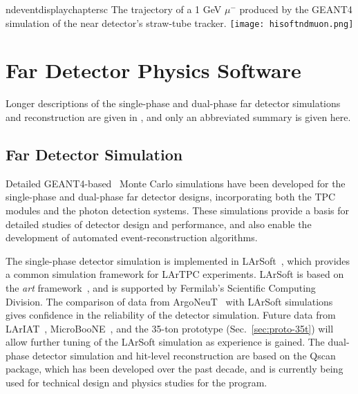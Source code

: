 \begin{cdrfigure}{ndeventdisplaychaptersc}
{The trajectory of a 1 GeV $\mu^-$ produced by the GEANT4 simulation of the near detector's straw-tube tracker.}
\texttt{[image: hisoftndmuon.png]}
\end{cdrfigure}

\section{Far Detector Physics Software}
\label{sec:detectors-sc-physics-software}

Longer descriptions of the single-phase and dual-phase far detector simulations and reconstruction are given
in \anxreco, and only an abbreviated summary is given here.

%

\subsection{Far Detector Simulation}
\label{sec:detectors-sc-physics-software-simulation-fd}

Detailed GEANT4-based~\cite{GEANT4:NIM,GEANT4} Monte Carlo simulations have been 
developed for the single-phase and dual-phase far detector designs,
incorporating both the TPC modules
and the photon detection systems. These simulations provide
a basis for detailed studies of detector design and performance, 
and also enable the development of automated event-reconstruction algorithms.

The single-phase detector simulation is implemented in LArSoft~\cite{Church:2013hea},
which provides a common simulation framework for LArTPC experiments.
LArSoft is based on the {\it art} framework~\cite{Green:2012gv}, and is supported by Fermilab's
Scientific Computing Division.
The comparison of data from ArgoNeuT~\cite{Anderson:2012vc,Anderson:2012mra} with LArSoft
simulations gives confidence in the reliability of the detector simulation.
Future data from LArIAT~\cite{Adamson:2013/02/28tla,Cavanna:2014iqa},
MicroBooNE~\cite{Chen:2007ae,Jones:2011ci,microboonecdr}, and the 35-ton prototype (Sec.~\ref{sec:proto-35t}) will allow
further tuning of the LArSoft simulation as experience is gained.
The dual-phase detector simulation and hit-level reconstruction are based on the Qscan~\cite{lussi:thesis} package,
which has been developed over the past decade, and is currently
being used for technical design and physics studies for
the \cerndualproto{} program.  

